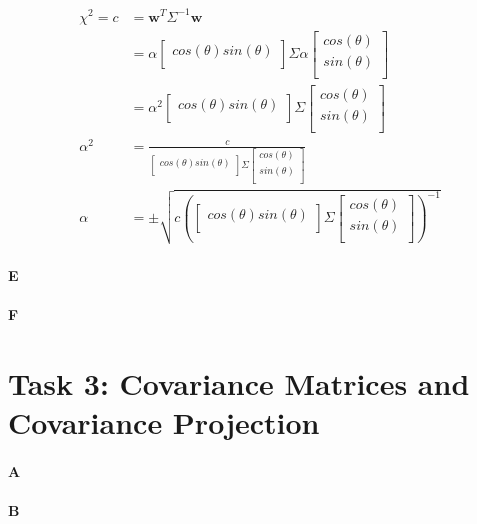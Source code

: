 \documentclass[12pt]{article}
\begin{document}
\begin{align*}
\chi^2 = c &=  \mathbf{w}^T \Sigma^{-1} \mathbf{w} \\
&=  \alpha \left[ {\begin{smallmatrix}
	cos(\theta)  sin(\theta)  \\
	 \end{smallmatrix} } \right]
 	\Sigma
 	\alpha \left[ {\begin{smallmatrix}
	cos(\theta)  \\
	sin(\theta)  \\
	 \end{smallmatrix} } \right] \\
&= \alpha^2 \left[ {\begin{smallmatrix}
	cos(\theta)  sin(\theta)  \\
	 \end{smallmatrix} } \right]
 	\Sigma
 	\left[ {\begin{smallmatrix}
	cos(\theta)  \\
	sin(\theta)  \\
	 \end{smallmatrix} } \right] \\
\alpha^2 &= \frac{c}{\left[ {\begin{smallmatrix}
	cos(\theta)  sin(\theta)  \\
	 \end{smallmatrix} } \right]
 	\Sigma
 	\left[ {\begin{smallmatrix}
	cos(\theta)  \\
	sin(\theta)  \\
	 \end{smallmatrix} } \right]} \\
\alpha &=\pm\sqrt{ c \left( \left[ {\begin{smallmatrix}
	cos(\theta)  sin(\theta)  \\
	 \end{smallmatrix} } \right]
 	\Sigma
 	\left[ {\begin{smallmatrix}
	cos(\theta)  \\
	sin(\theta)  \\
	 \end{smallmatrix} } \right]
	 \right)^{-1}}
\end{align*}


\paragraph{E}

\paragraph{F}

\section{Task 3: Covariance Matrices and Covariance Projection}

\paragraph{A}

\paragraph{B}
\end{document}
